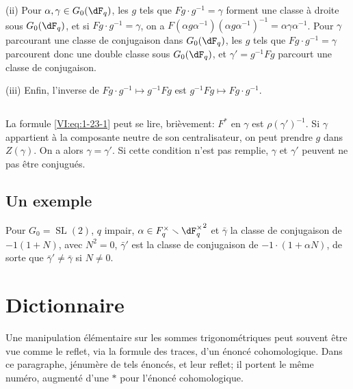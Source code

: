 (ii) Pour $\alpha,\gamma\in G_0(\dF_q)$, les $g$ tels que 
$F g\cdot g^{-1} = \gamma$ forment une classe \`a droite sous $G_0(\dF_q)$, et 
si $F g\cdot g^{-1} = \gamma$, on a 
$F(\alpha g \alpha^{-1})(\alpha g \alpha^{-1})^{-1} = \alpha \gamma\alpha^{-1}$. 
Pour $\gamma$ parcourant une classe de conjugaison dans $G_0(\dF_q)$, les $g$ 
tels que $F g\cdot g^{-1} = \gamma$ parcourent donc une double classe sous 
$G_0(\dF_q)$, et $\gamma'= g^{-1} F g$ parcourt une classe de conjugaison. 

(iii) Enfin, l'inverse de $F g\cdot g^{-1}\mapsto g^{-1} F g$ est 
$g^{-1} F g\mapsto F g\cdot g^{-1}$. 





\subsection{}\label{VI:1-25}

La formule \eqref{VI:eq:1-23-1} peut se lire, bri\`evement: $F^\ast$ en 
$\gamma$ est $\rho(\gamma')^{-1}$. Si $\gamma$ appartient \`a la composante 
neutre de son centralisateur, on peut prendre $g$ dans $Z(\gamma)$. On a alors 
$\gamma=\gamma'$. Si cette condition n'est pas remplie, $\gamma$ et $\gamma'$ 
peuvent ne pas \^etre conjugu\'es. 





\subsection{Un exemple}\label{VI:1-26}

Pour $G_0=\operatorname{SL}(2)$, $q$ impair, 
$\alpha\in F_q^\times\setminus {\dF_q^\times}^2$ et $\bar\gamma$ la classe de 
conjugaison de $-1(1+N)$, avec $N^2=0$, $\bar\gamma'$ est la classe de 
conjugaison de $-1\cdot (1+\alpha N)$, de sorte que $\bar\gamma'\ne \bar\gamma$ 
si $N\ne 0$. 










\section{Dictionnaire}\label{VI:2}

Une manipulation \'el\'ementaire sur les sommes trigonom\'etriques peut souvent 
\^etre vue comme le reflet, via la formule des traces, d'un \'enonc\'e 
cohomologique. Dans ce paragraphe, j\'enum\`ere de tels \'enonc\'es, et leur 
reflet; il portent le m\^eme num\'ero, augment\'e d'une $\ast$ pour 
l'\'enonc\'e cohomologique. 





